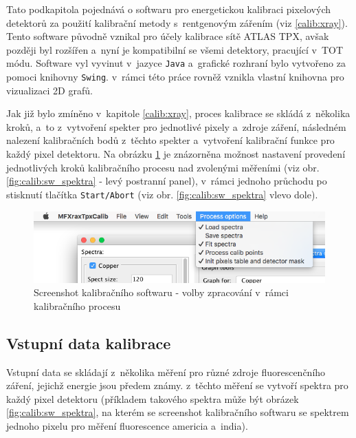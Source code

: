 
Tato podkapitola pojednává o softwaru pro energetickou kalibraci pixelových detektorů za použití kalibrační metody s~rentgenovým zářením (viz \ref{calib:xray}). Tento software původně vznikal pro účely kalibrace sítě ATLAS TPX, avšak později byl rozšířen a~nyní je kompatibilní se všemi detektory, pracující v~TOT módu. Software vyl vyvinut v~jazyce \texttt{Java} a~grafické rozhraní bylo vytvořeno za pomoci knihovny \texttt{Swing}. v~rámci této práce rovněž vznikla vlastní knihovna pro vizualizaci 2D grafů.

Jak již bylo zmíněno v~kapitole \ref{calib:xray}, proces kalibrace se skládá z~několika kroků, a~to z~vytvoření spekter pro jednotlivé pixely a~zdroje záření, následném nalezení kalibračních bodů z~těchto spekter a~vytvoření kalibrační funkce pro každý pixel detektoru. Na obrázku \ref{fig:calib:sw_process_ops} je znázorněna možnost nastavení provedení jednotlivých kroků kalibračního procesu nad zvolenými měřeními (viz obr. \ref{fig:calib:sw_spektra} - levý postranní panel), v~rámci jednoho průchodu po stisknutí tlačítka \texttt{Start/Abort} (viz obr. \ref{fig:calib:sw_spektra} vlevo dole).

\begin{figure}[th]
	\begin{center}
		\includegraphics[width=14cm]{figures/calibsw_process_ops.png}
		\caption{Screenshot kalibračního softwaru - volby zpracování v~rámci kalibračního procesu}
		\label{fig:calib:sw_process_ops}
	\end{center}
\end{figure}


\subsection{Vstupní data kalibrace}
Vstupní data se skládají z~několika měření pro různé zdroje fluorescenčního záření, jejichž energie jsou předem známy. z~těchto měření se vytvoří spektra pro každý pixel detektoru (příkladem takového spektra může být obrázek \ref{fig:calib:sw_spektra}, na kterém se screenshot kalibračního softwaru se spektrem jednoho pixelu pro měření fluorescence americia a~india).

